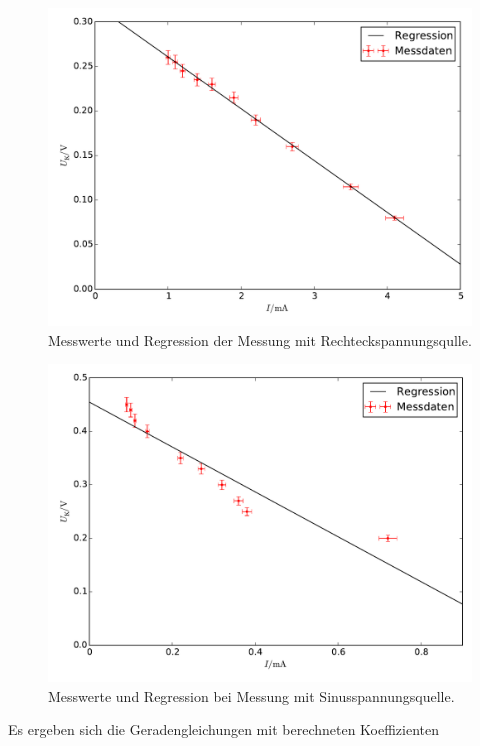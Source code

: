\begin{figure}[h]
	\centering
	\label{fig:Recht}
	\includegraphics[width=\textwidth]{content/plot_Recht.pdf}
	\caption{Messwerte und Regression der Messung mit Rechteckspannungsqulle.}
\label{fig:Recht}
\end{figure}
\begin{figure}[h]
	\centering
	\includegraphics[width=\textwidth]{content/plot_Sin.pdf}
	\caption{Messwerte und Regression bei Messung mit Sinusspannungsquelle.}
	\label{fig:Sin}
\end{figure}

Es ergeben sich die Geradengleichungen mit berechneten Koeffizienten

